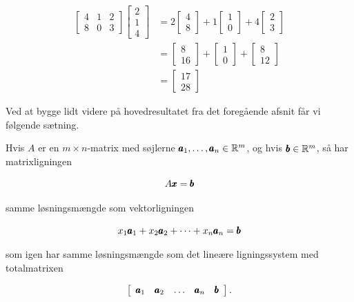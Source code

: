 \begin{example}
    \[
\begin{aligned}
{\left[\begin{array}{lll}
4 & 1 & 2 \\
8 & 0 & 3
\end{array}\right]\left[\begin{array}{l}
2 \\
1 \\
4
\end{array}\right] } & =2\left[\begin{array}{l}
4 \\
8
\end{array}\right]+1\left[\begin{array}{l}
1 \\
0
\end{array}\right]+4\left[\begin{array}{l}
2 \\
3
\end{array}\right] \\
& =\left[\begin{array}{c}
8 \\
16
\end{array}\right]+\left[\begin{array}{l}
1 \\
0
\end{array}\right]+\left[\begin{array}{c}
8 \\
12
\end{array}\right] \\
& =\left[\begin{array}{l}
17 \\
28
\end{array}\right]
\end{aligned}
\]
\end{example}

Ved at bygge lidt videre på hovedresultatet fra det foregående afsnit får vi følgende sætning.

\begin{theorem}
    Hvis $A$ er en $m \times n$-matrix med søjlerne $\pmb{a}_1, \ldots, \pmb{a}_n \in \mathbb{R}^m$, og hvis $\pmb{b} \in \mathbb{R}^m$, så har matrixligningen

\[
A \pmb{x} = \pmb{b}
\]

samme løsningsmængde som vektorligningen

\[
x_1 \pmb{a}_1 + x_2 \pmb{a}_2 + \cdots + x_n \pmb{a}_n = \pmb{b}
\]

som igen har samme løsningsmængde som det lineære ligningssystem med totalmatrixen

\[
\left[\begin{array}{lllll}
\pmb{a}_1 & \pmb{a}_2 & \ldots & \pmb{a}_n & \pmb{b}
\end{array}\right].
\]

\end{theorem}

